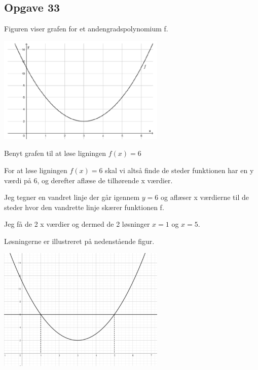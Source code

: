 \subsection{Opgave 33}

Figuren viser grafen for et andengradspolynomium f.

\includegraphics[width=8cm]{Opgave_31-40/Opgave_33/33.png}

Benyt grafen til at løse ligningen $f(x) = 6$

\ans

For at løse ligningen $f(x) = 6$ skal vi altså finde de steder funktionen har en y værdi på 6, og derefter aflæse de tilhørende x værdier.

Jeg tegner en vandret linje der går igennem $y = 6$ og aflæser x værdierne til de steder hvor den vandrette linje skærer funktionen f.

Jeg få de 2 x værdier og dermed de 2 løsninger $x = 1$ og $x = 5$.

Løsningerne er illustreret på nedenstående figur.

\includegraphics[width=8cm]{Opgave_31-40/Opgave_33/33.1.png}